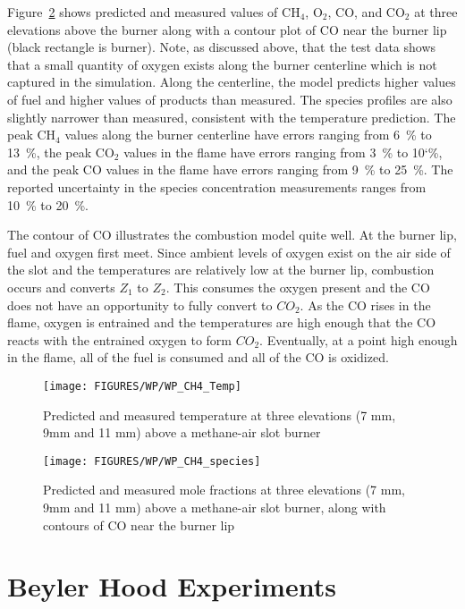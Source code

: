 Figure~\ref{WP_CH4_Species} shows predicted and
measured values of CH$_4$, O$_2$, CO,  and CO$_2$ at three elevations above the burner along with a contour plot of CO near the
burner lip (black rectangle is burner).  Note, as discussed above, that the test data shows that a small quantity of oxygen exists along
the burner centerline which is not captured in the simulation.  Along the centerline, the model predicts higher values of fuel and higher values of
products than measured.  The species profiles are also slightly narrower than measured, consistent with the temperature prediction.  
The peak CH$_4$ values along the burner centerline have errors ranging from 6~\% to 13~\%,
the peak CO$_2$ values in the flame have errors ranging from 3~\% to 10`\%, and the peak CO values in the flame have
errors ranging from 9~\% to 25~\%.  The reported uncertainty in the species concentration measurements ranges from 10~\% to 20~\%. 

The contour of CO illustrates the combustion model quite well.  At the burner lip, fuel and oxygen first meet.
Since ambient levels of oxygen exist on the air side of the slot and the temperatures are relatively low at the
burner lip, combustion occurs and converts $Z_1$ to $Z_2$.  This consumes the oxygen present and the CO does not have an
opportunity to fully convert to $CO_2$.  As the CO rises in the flame, oxygen is entrained and the temperatures are high
enough that the CO reacts with the entrained oxygen to form $CO_2$.  Eventually, at a point high enough in the flame,
all of the fuel is consumed and all of the CO is oxidized.

\begin{figure}
\texttt{[image: FIGURES/WP/WP\_CH4\_Temp]}
\caption{Predicted and measured temperature at three elevations (7 mm, 9mm and 11 mm) above a methane-air slot burner}
\label{WP_CH4_Temp}
\end{figure}

\begin{figure}
\texttt{[image: FIGURES/WP/WP\_CH4\_species]}
\caption{Predicted and measured mole fractions at three elevations (7 mm, 9mm and 11 mm) above a methane-air slot burner,
along with contours of CO near the burner lip}
\label{WP_CH4_Species}
\end{figure}

\clearpage

\section{Beyler Hood Experiments}

